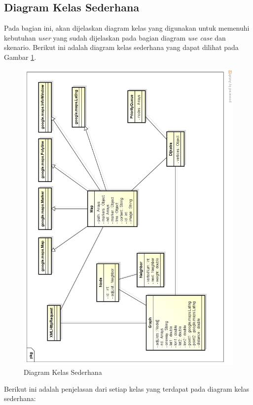\subsection{Diagram Kelas Sederhana}
Pada bagian ini, akan dijelaskan diagram kelas yang digunakan untuk memenuhi
kebutuhan \textit{user} yang sudah dijelaskan pada bagian diagram \textit{use
case} dan skenario. Berikut ini adalah diagram kelas sederhana yang dapat
dilihat pada Gambar \ref{fig:diagram_kelas}.
\begin{figure}[h]
\centering
\includegraphics[scale=0.6]{Gambar/diagram_kelas}
\caption[Diagram Kelas Sederhana]{Diagram Kelas Sederhana}
\label{fig:diagram_kelas}
\end{figure}
Berikut ini adalah penjelasan dari setiap kelas yang terdapat pada diagram
kelas sederhana:
